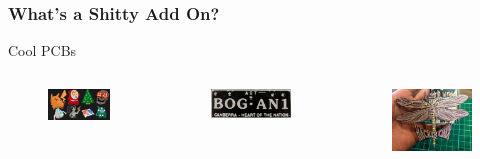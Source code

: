 \documentclass[t]{beamer}
\begin{document}
\begin{frame}
\frametitle{What's a Shitty Add On?}
Cool PCBs 
\begin{columns}[c]
	\begin{figure}
		\includegraphics[width=1\linewidth]{shittyadd-ons.png}
	\end{figure}

	\begin{figure}
		\includegraphics[width=1\linewidth]{bogan.jpg}
	\end{figure}
	
	\begin{figure}
		\includegraphics[width=1\linewidth]{hackerchix.jpg}
	\end{figure}
	

\end{columns}
\end{frame}
\end{document}
